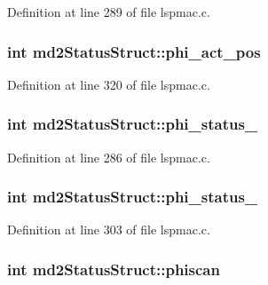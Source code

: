 Definition at line 289 of file lspmac.\-c.

\hypertarget{structmd2StatusStruct_a4de22995a72ff6e72a1a9ccab6d00620}{
\subsubsection[{phi\-\_\-act\-\_\-pos}]{\setlength{\rightskip}{0pt plus 5cm}int md2\-Status\-Struct\-::phi\-\_\-act\-\_\-pos}}\label{structmd2StatusStruct_a4de22995a72ff6e72a1a9ccab6d00620}


Definition at line 320 of file lspmac.\-c.

\hypertarget{structmd2StatusStruct_ad8b8fd90ffff43016e2adaab5ccbfa02}{
\subsubsection[{phi\-\_\-status\-\_\-1}]{\setlength{\rightskip}{0pt plus 5cm}int md2\-Status\-Struct\-::phi\-\_\-status\-\_}}\label{structmd2StatusStruct_ad8b8fd90ffff43016e2adaab5ccbfa02}


Definition at line 286 of file lspmac.\-c.

\hypertarget{structmd2StatusStruct_a0e6cea4c32cb34e602b9ac3d21259219}{
\subsubsection[{phi\-\_\-status\-\_\-2}]{\setlength{\rightskip}{0pt plus 5cm}int md2\-Status\-Struct\-::phi\-\_\-status\-\_}}\label{structmd2StatusStruct_a0e6cea4c32cb34e602b9ac3d21259219}


Definition at line 303 of file lspmac.\-c.

\hypertarget{structmd2StatusStruct_abe3d4a61a15f54590b061e23b45e659c}{
\subsubsection[{phiscan}]{\setlength{\rightskip}{0pt plus 5cm}int md2\-Status\-Struct\-::phiscan}}\label{structmd2StatusStruct_abe3d4a61a15f54590b061e23b45e659c}


